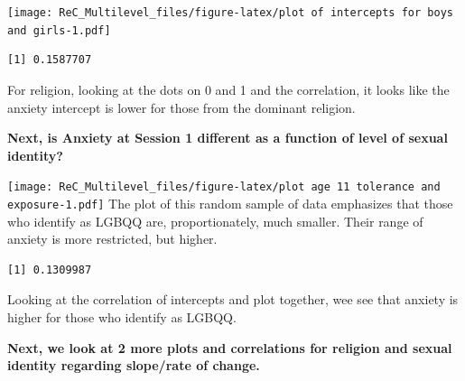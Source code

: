 \documentclass[
  11pt,
]{book}
\newenvironment{Shaded}{\begin{snugshade}}{\end{snugshade}}
\newcommand{\AttributeTok}[1]{\textcolor[rgb]{0.77,0.63,0.00}{#1}}
\newcommand{\FunctionTok}[1]{\textcolor[rgb]{0.00,0.00,0.00}{#1}}
\newcommand{\NormalTok}[1]{#1}
\newcommand{\SpecialCharTok}[1]{\textcolor[rgb]{0.00,0.00,0.00}{#1}}
\newcommand{\StringTok}[1]{\textcolor[rgb]{0.31,0.60,0.02}{#1}}
\begin{document}
\texttt{[image: ReC\_Multilevel\_files/figure-latex/plot of intercepts for boys and girls-1.pdf]}

\begin{Shaded}
\end{Shaded}

\begin{verbatim}
[1] 0.1587707
\end{verbatim}

For religion, looking at the dots on 0 and 1 and the correlation, it looks like the anxiety intercept is lower for those from the dominant religion.

\textbf{Next, is Anxiety at Session 1 different as a function of level of sexual identity?}

\begin{Shaded}
\end{Shaded}

\texttt{[image: ReC\_Multilevel\_files/figure-latex/plot age 11 tolerance and exposure-1.pdf]}
The plot of this random sample of data emphasizes that those who identify as LGBQQ are, proportionately, much smaller. Their range of anxiety is more restricted, but higher.

\begin{Shaded}
\end{Shaded}

\begin{verbatim}
[1] 0.1309987
\end{verbatim}

Looking at the correlation of intercepts and plot together, wee see that anxiety is higher for those who identify as LGBQQ.

\textbf{Next, we look at 2 more plots and correlations for religion and sexual identity regarding slope/rate of change.}
\end{document}
